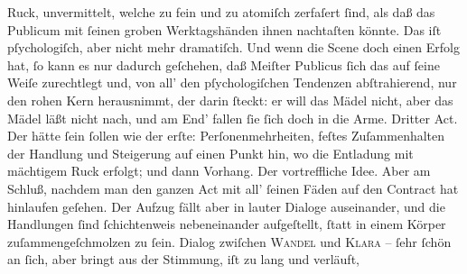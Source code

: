                Ruck, unvermittelt, welche zu fein und zu atomiſch zerfaſert ſind, als daß das
               Publicum mit ſeinen groben Werktagshänden ihnen nachtaſten könnte. Das iſt
               pſychologiſch, aber nicht mehr dramatiſch. Und wenn die Scene doch einen Erfolg hat,
               ſo kann es nur dadurch geſchehen, daß Meiſter Publicus ſich das auf ſeine Weiſe
               zurechtlegt und, von all’  den pſychologiſchen  Tendenzen abſtrahierend, nur den rohen Kern herausnimmt, der darin ſteckt: er
               will das Mädel nicht, aber das Mädel läßt nicht nach, und am End’ fallen ſie ſich
               doch in die Arme. Dritter Act.
               Der hätte ſein ſollen wie der erſte: Perſonenmehrheiten, feſtes Zuſammenhalten der
               Handlung und Steigerung  auf einen Punkt hin, wo
               die Entladung mit mächtigem Ruck erfolgt; und dann Vorhang. Der \label{K_L02674-6v}\label{K_L02674-6}{ }{\pb}vortreffliche Idee. Aber am Schluß, nachdem man den
               ganzen Act mit all’ ſeinen
               Fäden auf den Contract hat hinlaufen geſehen. Der Aufzug fällt aber in lauter Dialoge auseinander, und die
               Handlungen ſind ſchichtenweis nebeneinander aufgeſtellt, ſtatt in einem Körper
               zuſammengeſchmolzen zu ſein. Dialog zwiſchen \textsc{Wandel} und \textsc{Klara} – ſehr ſchön an ſich, aber bringt aus der Stimmung, iſt zu lang und verläuft,
